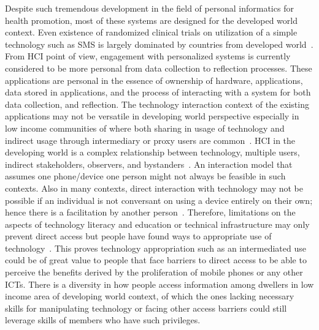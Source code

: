 Despite such tremendous development in the field of personal informatics for health promotion, most of these systems are designed for the developed world context. Even existence of randomized clinical trials on utilization of a simple technology such as SMS is largely dominated by countries from developed world~\citep{cole2010text}. From HCI point of view, engagement with personalized systems is currently considered to be more personal from data collection to reflection processes. These applications are personal in the essence of ownership of hardware, applications, data stored in applications, and the process of interacting with a system for both data collection, and reflection. The technology interaction context of the existing applications may not be versatile in developing world perspective especially in low income communities of where  both sharing in usage of technology and indirect usage through intermediary or proxy users are common~\citep{kaplan2006can,sambasivan2010}. HCI in the developing world is a complex relationship between technology, multiple users, indirect stakeholders, observers, and bystanders~\citep{parikh2006}. An interaction model that assumes one phone/device one person might not always be feasible in such contexts. Also in many contexts, direct interaction with technology may not be possible if an individual is not conversant on using a device entirely on their own; hence there is a facilitation by another person~\citep{sambasivan2010}. Therefore, limitations on the aspects of technology literacy and education or technical infrastructure may only prevent direct access but people have found ways to appropriate use of technology~\citep{parikh2006,smyth2010there,sambasivan2010human}. This proves technology appropriation such as an intermediated use could be of great value to people that face barriers to direct access to be able to perceive the benefits derived by the proliferation of mobile phones or any other ICTs. There is a diversity in how people access information among dwellers in low income area of developing world context, of which the ones lacking necessary skills for manipulating technology or facing other access barriers could still leverage skills of members who have such privileges\citep{sambasivan2010}.

